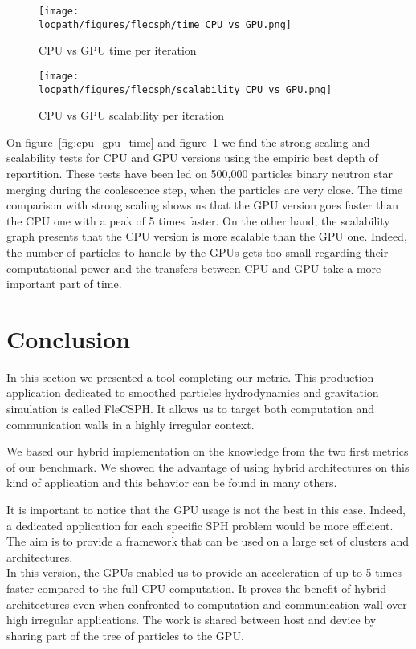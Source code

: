 \begin{figure}[t!]
\centering
\begin{minipage}[b]{.44\textwidth}
\centering
	\texttt{[image: \\locpath/figures/flecsph/time\_CPU\_vs\_GPU.png]}
	\caption{CPU vs GPU time per iteration}
	\label{fig:cpu_gpu_time}
\end{minipage}
\hfill
\begin{minipage}[b]{.44\textwidth}
\centering
	\texttt{[image: \\locpath/figures/flecsph/scalability\_CPU\_vs\_GPU.png]}
	\caption{CPU vs GPU scalability per iteration}
	\label{fig:cpu_gpu_scala}
\end{minipage}
\end{figure}

On figure~\ref{fig:cpu_gpu_time} and figure~\ref{fig:cpu_gpu_scala} we find the strong scaling and scalability tests for CPU and GPU versions using the empiric best depth of repartition.
These tests have been led on 500,000 particles binary neutron star merging during the coalescence step, when the particles are very close. 
The time comparison with strong scaling shows us that the GPU version goes faster than the CPU one with a peak of 5 times faster. 
On the other hand, the scalability graph presents that the CPU version is more scalable than the GPU one. 
Indeed, the number of particles to handle by the GPUs gets too small regarding their computational power and the transfers between CPU and GPU take a more important part of time. 

\section{Conclusion}
In this section we presented a tool completing our metric. 
This production application dedicated to smoothed particles hydrodynamics and gravitation simulation is called FleCSPH. 
It allows us to target both computation and communication walls in a highly irregular context.

We based our hybrid implementation on the knowledge from the two first metrics of our benchmark.
We showed the advantage of using hybrid architectures on this kind of application and this behavior can be found in many others. 

It is important to notice that the GPU usage is not the best in this case. 
Indeed, a dedicated application for each specific SPH problem would be more efficient. 
The aim is to provide a framework that can be used on a large set of clusters and architectures.\\

In this version, the GPUs enabled us to provide an acceleration of up to 5 times faster compared to the full-CPU computation.
It proves the benefit of hybrid architectures even when confronted to computation and communication wall over high irregular applications. 
The work is shared between host and device by sharing part of the tree of particles to the GPU. 
